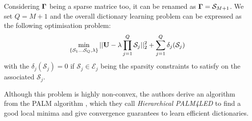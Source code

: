 Considering ${\mathbf{\Gamma}}$ being a sparse matrice too, it can be renamed as ${\mathbf{\Gamma}} = \mathcal{S}_{M+1}$. We set $Q = M+1$ and the overall dictionary learning problem can be expressed as the following optimisation problem:
%
\begin{equation}
\label{eq:problem_gribon}
\min_{\{\mathcal{S}_1 \dots \mathcal{S}_Q, \lambda\}} ||{\mathbf{U}} - \lambda \prod_{j=1}^{Q}{\mathcal{S}_j}||_2^2 + \sum_{j=1}^{Q} \delta_j(\mathcal{S}_j)
\end{equation}
%
with the $\delta_j(\mathcal{S}_j) = 0$ if $\mathcal{S}_j \in \mathcal{E}_j$ being the sparsity constraints to satisfy on the associated $\mathcal{S}_j$.

Although this problem is highly non-convex, the authors derive an algorithm from the PALM algorithm \cite{bolte2014proximal}, which they call \textit{Hierarchical PALM4LED} to find a good local minima and give convergence guarantees to learn efficient dictionaries.



